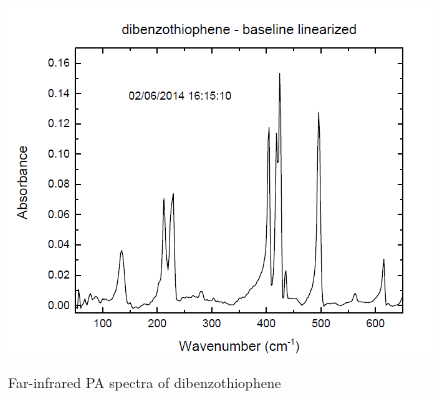 	
	\begin{figure}[H]
		\centering
		\includegraphics[scale=0.53]{image/image/Spectra-diben}  \label{P1-spectradiben}
		\caption{Far-infrared PA spectra of dibenzothiophene}
	\end{figure}
	
	
	
